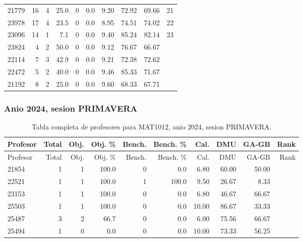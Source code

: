 \begin{longtable}{lrrrrrrrrr}
21779 & 16 & 4 & 25.0 & 0 & 0.0 & 9.20 & 72.92 & 69.66 & 21 \\
23978 & 17 & 4 & 23.5 & 0 & 0.0 & 8.95 & 74.51 & 74.02 & 22 \\
23096 & 14 & 1 & 7.1 & 0 & 0.0 & 9.40 & 85.24 & 82.14 & 23 \\
23824 & 4 & 2 & 50.0 & 0 & 0.0 & 9.12 & 76.67 & 66.67 &  \\
22114 & 7 & 3 & 42.9 & 0 & 0.0 & 9.21 & 72.38 & 72.62 &  \\
22472 & 5 & 2 & 40.0 & 0 & 0.0 & 9.46 & 85.33 & 71.67 &  \\
21192 & 8 & 2 & 25.0 & 0 & 0.0 & 9.60 & 68.33 & 67.71 &  \\
\bottomrule
\end{longtable}
\endgroup

\subsubsection{Anio 2024, sesion PRIMAVERA}

\begingroup
\scriptsize
\setlength{\tabcolsep}{3pt}
\begin{longtable}{lrrrrrrrrr}
\caption{Tabla completa de profesores para MAT1012, anio 2024, sesion PRIMAVERA.}\label{tab:prof-period-mat1012-2024-primavera-especializado}\\
\toprule
Profesor & Total & Obj. & Obj. \% & Bench. & Bench. \% & Cal. & DMU & GA-GB & Rank \\
\midrule
\endfirsthead
\toprule
Profesor & Total & Obj. & Obj. \% & Bench. & Bench. \% & Cal. & DMU & GA-GB & Rank \\
\midrule
\endhead
21854 & 1 & 1 & 100.0 & 0 & 0.0 & 6.80 & 60.00 & 50.00 &  \\
22521 & 1 & 1 & 100.0 & 1 & 100.0 & 9.50 & 26.67 & 8.33 &  \\
23153 & 1 & 1 & 100.0 & 0 & 0.0 & 6.80 & 46.67 & 66.67 &  \\
25503 & 1 & 1 & 100.0 & 0 & 0.0 & 10.00 & 86.67 & 33.33 &  \\
25487 & 3 & 2 & 66.7 & 0 & 0.0 & 6.00 & 75.56 & 66.67 &  \\
25494 & 1 & 0 & 0.0 & 0 & 0.0 & 10.00 & 73.33 & 56.25 &  \\
\bottomrule
\end{longtable}
\endgroup